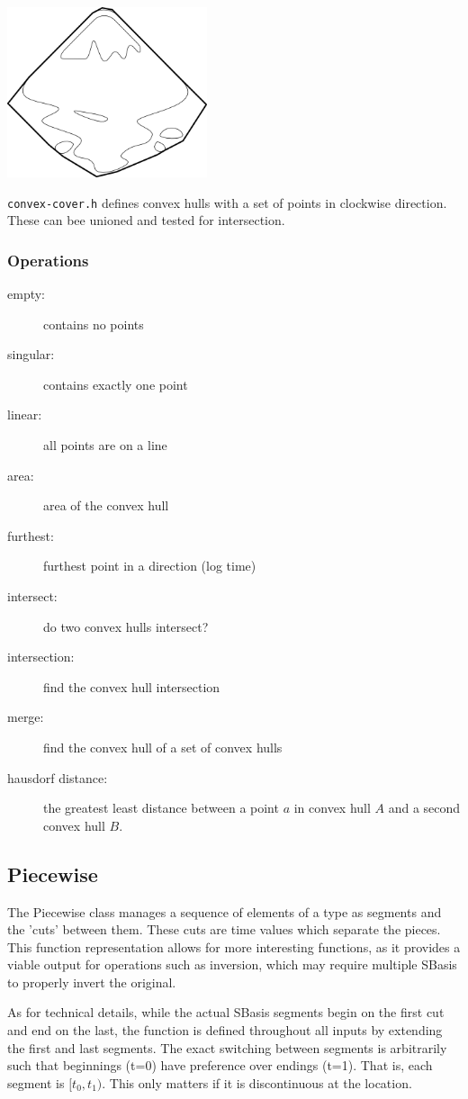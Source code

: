 \documentclass[openany]{book}
\newcommand{\code}[1]{\textsf{#1}}
\begin{document}
\includegraphics[height=50mm]{media/convex.png}

\verb|convex-cover.h| defines convex hulls with a set of points in clockwise direction.  These can bee unioned and tested for intersection.

\subsubsection{Operations}
\begin{description}
\item[empty:] contains no points
\item[singular:] contains exactly one point
\item[linear:] all points are on a line
\item[area:] area of the convex hull
\item[furthest:] furthest point in a direction (log time)
\item[intersect:] do two convex hulls intersect?
\item[intersection:] find the convex hull intersection
\item[merge:] find the convex hull of a set of convex hulls
\item[hausdorf distance:] the greatest least distance between a point $a$ in convex hull $A$ and a second convex hull $B$.
\end{description}

\subsection{Piecewise}
The \code{Piecewise} class manages a sequence of elements of a type as
segments and the 'cuts' between them.  These cuts are time values which
separate the pieces.  This function representation allows for
more interesting functions, as it provides a viable output for operations
such as inversion, which may require multiple SBasis to properly invert
the original.

As for technical details, while the actual SBasis segments begin on the
first cut and end on the last, the function is defined throughout all
inputs by extending the first and last segments.  The exact switching
between segments is arbitrarily such that beginnings (t=0) have
preference over endings (t=1).  That is, each segment is $[t_0, t_1)$.  
This only matters if it is discontinuous at the location.
\end{document}
